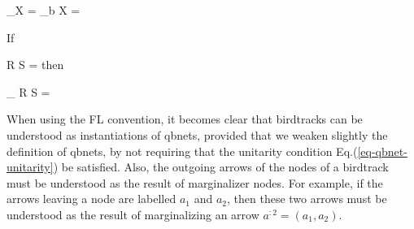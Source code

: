 \beq
\tr_\rvb X
=
\sum_b X
=
\bcen
{}\ecen
\eeq

If

\beq
R
S =
\bcen
{}
\ecen
\eeq
then

\beq
\tr_\rvx
R
S 
=
\bcen
{}
\ecen
\eeq

When using the FL convention,
it becomes clear that
birdtracks can
be understood
as instantiations of
qbnets, provided that we
weaken slightly the definition
of qbnets, by
not requiring
that the 
unitarity condition
Eq.(\ref{eq-qbnet-unitarity})
be satisfied. Also,
the outgoing arrows
of the nodes
of a birdtrack
must be understood
as the result of marginalizer nodes.
For example,
if the arrows leaving
a node are labelled $a_1$ and $a_2$,
then
these two arrows
must be understood 
as the result
of marginalizing
an arrow $a^{:2}=(a_1, a_2)$.